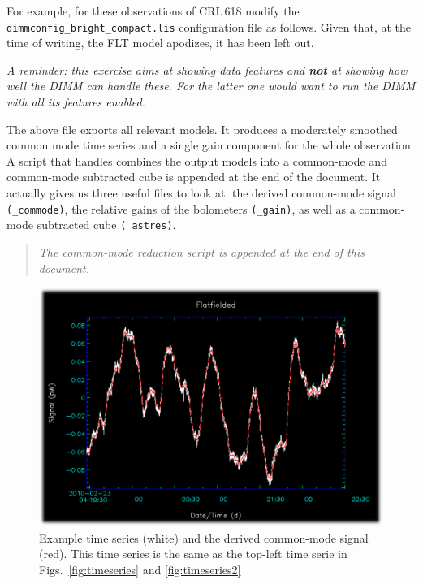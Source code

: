 \documentclass[twoside,11pt]{starlink}
\newenvironment{myquote}{\begin{quote}\begin{small}}{\end{small}\end{quote}}
\begin{document}
For example, for these observations of CRL\,618 modify the
\texttt{dimmconfig\_bright\_compact.lis} configuration file as
follows. Given that, at the time of writing, the FLT model apodizes,
it has been left out.

\emph{A reminder: this exercise aims at showing data features and
\textbf{not} at showing how well the DIMM can handle these. For the
latter one would want to run the DIMM with all its features
enabled.}

\begin{small}
\end{small}

The above file exports all relevant models. It produces a moderately
smoothed common mode time series and a single gain component for the
whole observation. A script that handles combines the output models
into a common-mode and common-mode subtracted cube is appended at the
end of the document. It actually gives us three useful files to look
at: the derived common-mode signal \texttt{(\_commode)}, the relative
gains of the bolometers \texttt{(\_gain)}, as well as a common-mode
subtracted cube \texttt{(\_astres)}.

\begin{myquote}
\textsl{The common-mode reduction script is appended at the end of this document.}
\end{myquote}

\begin{figure}[ht]
\begin{center}
\includegraphics[width=0.45\linewidth]{sc19_dimm_common_mode}
\caption{Example time series (white) and the derived
common-mode signal (red).  This time series is the same as the
top-left time serie in Figs.~\ref{fig:timeseries} and \ref{fig:timeseries2}}
\label{fig:dimmcommonmode}
\end{center}
\end{figure}
\end{document}
